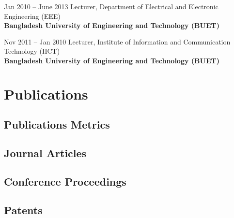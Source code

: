 \documentclass[cvauthor={Dr. Sajid Muhaimin Choudhury}]{buetcv}
\begin{document}
        \begin{twocolentry}{
            Jan 2010 – June 2013
            }
            Lecturer, Department of Electrical and Electronic Engineering (EEE) \\ \textbf{Bangladesh University of Engineering and Technology (BUET)}\\
        \end{twocolentry}

        \begin{twocolentry}{
            Nov 2011 – Jan 2010
            }
            Lecturer, Institute of Information and Communication Technology (IICT) \\ \textbf{Bangladesh University of Engineering and Technology (BUET)}\\
        \end{twocolentry}        
    
        
\section{Publications}
\vspace{0.2 cm}
\subsection{Publications Metrics}

\vspace{0.2 cm}   
\subsection{Journal Articles}
\nocite{*}
\newrefcontext[labelprefix=J]
\printbibliography[env=counter,type=article,heading=none]

  \printbibliography[type=article,heading=none]



\subsection{Conference Proceedings}
\nocite{*}
\newrefcontext[labelprefix=C]
\printbibliography[env=counter,type=inproceedings,heading=none]
\printbibliography[type=inproceedings,heading=none]


\subsection{Patents}
\nocite{*}
\newrefcontext[labelprefix=P]
\printbibliography[env=counter,type=patent,heading=none]
\printbibliography[type=patent,heading=none]
\end{document}
